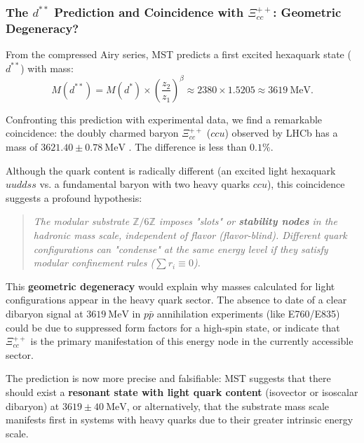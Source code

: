 \documentclass[11pt, a4paper]{article}
\theoremstyle{plain}
\theoremstyle{definition}
\begin{document}
\subsubsection{The \texorpdfstring{$d^{**}$}{d**} Prediction and Coincidence with \texorpdfstring{$\Xi_{cc}^{++}$}{Ξcc++}: Geometric Degeneracy?}
\label{subsec:dstarstar_coincidence}

From the compressed Airy series, MST predicts a first excited hexaquark state ($d^{**}$) with mass:
\begin{equation}
M(d^{**}) = M(d^*) \times \left(\frac{z_2}{z_1}\right)^\beta \approx 2380 \times 1.5205 \approx 3619\ \si{\mega\electronvolt}.
\end{equation}

Confronting this prediction with experimental data, we find a remarkable coincidence: the doubly charmed baryon $\Xi_{cc}^{++}$ ($ccu$) observed by LHCb has a mass of $3621.40 \pm 0.78\ \si{\mega\electronvolt}$ \cite{LHCb2017_Xicc}. The difference is less than $0.1\%$.

Although the quark content is radically different (an excited light hexaquark $uuddss$ vs. a fundamental baryon with two heavy quarks $ccu$), this coincidence suggests a profound hypothesis:

\begin{quote}
\emph{The modular substrate $\mathbb{Z}/6\mathbb{Z}$ imposes "slots" or \textbf{stability nodes} in the hadronic mass scale, independent of flavor (\textit{flavor-blind}). Different quark configurations can "condense" at the same energy level if they satisfy modular confinement rules ($\sum r_i \equiv 0$).}
\end{quote}

This \textbf{geometric degeneracy} would explain why masses calculated for light configurations appear in the heavy quark sector. The absence to date of a clear dibaryon signal at $3619\ \si{\mega\electronvolt}$ in $p\bar{p}$ annihilation experiments (like E760/E835) could be due to suppressed form factors for a high-spin state, or indicate that $\Xi_{cc}^{++}$ is the primary manifestation of this energy node in the currently accessible sector.

The prediction is now more precise and falsifiable: MST suggests that there should exist a \textbf{resonant state with light quark content} (isovector or isoscalar dibaryon) at $3619 \pm 40\ \si{\mega\electronvolt}$, or alternatively, that the substrate mass scale manifests first in systems with heavy quarks due to their greater intrinsic energy scale.
\end{document}
